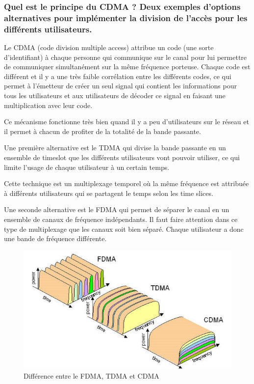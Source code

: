 \subsubsection{Quel est le principe du CDMA ? Deux exemples d'options alternatives pour
implémenter la division de l'accès pour les différents utilisateurs.}

Le CDMA (code division multiple access) attribue un code (une sorte d'identifiant) à chaque personne qui communique sur le canal pour lui permettre de communiquer simultanément sur la même fréquence porteuse.  Chaque code est différent et il y a une très faible corrélation entre les différents codes, ce qui permet à l'émetteur de créer un seul signal qui contient les informations pour tous les utilisateurs et aux utilisateurs de décoder ce signal en faisant une multiplication avec leur code.

Ce mécanisme fonctionne très bien quand il y a peu d'utilisateurs sur le réseau et il permet à chacun de profiter de la totalité de la bande passante.

Une première alternative est le TDMA qui divise la bande passante en un ensemble de timeslot que les différents utilisateurs vont pouvoir utiliser, ce qui limite l'usage de chaque utilisateur à un certain temps.

Cette technique est un multiplexage temporel où la même fréquence est attribuée à différents utilisateurs qui se partagent le temps selon les time slices.

Une seconde alternative est le FDMA qui permet de séparer le canal en un ensemble de canaux de fréquence indépendants. Il faut faire attention dans ce type de multiplexage que les canaux soit bien séparé. Chaque utilisateur a donc une bande de fréquence différente.

\begin{figure}[H]
    \centering
    \includegraphics[width=0.65\linewidth]{img/fdma_tdma_cdma.png}
    \caption{Différence entre le FDMA, TDMA et CDMA}
\end{figure}

